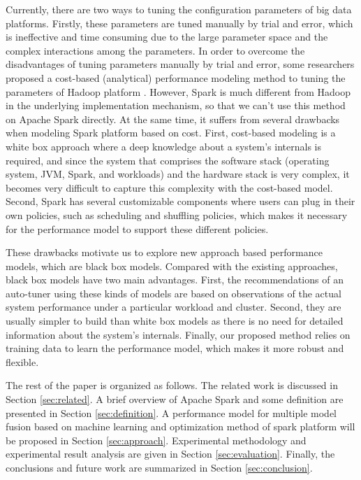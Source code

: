 \par Currently, there are two ways to tuning the configuration parameters of big data platforms. Firstly, these parameters are tuned manually by trial and error, which is ineffective and time consuming due to the large parameter space and the complex interactions among the parameters. In order to overcome the disadvantages of tuning parameters manually by trial and error, some researchers proposed a cost-based
(analytical) performance modeling method to tuning the parameters of Hadoop platform \cite{apachehadoop}. However, Spark is much different from Hadoop in the underlying implementation mechanism, so that we can’t use this method on Apache Spark directly. At the same time, it suffers from several drawbacks when modeling Spark platform based on cost. First, cost-based modeling is a white box approach where a deep knowledge
about a system’s internals is required, and since the system that comprises the software stack (operating system, JVM, Spark, and workloads) and the hardware stack is very complex, it becomes very difficult to capture this complexity with the cost-based model. Second, Spark has several customizable components where users can plug in their own policies, such as scheduling and shuffling policies, which makes it necessary for the performance model to support these different policies.

\par These drawbacks motivate us to explore new approach based performance models, which are black box models. Compared with the existing approaches, black box models have two main advantages. First, the recommendations of an auto-tuner using these kinds of models are based on observations of the actual system performance under a particular workload and cluster. Second, they are usually simpler to build than white box models as there is no need for detailed information about the system’s internals. Finally, our
proposed method relies on training data to learn the performance model, which makes it more robust and flexible.

\par The rest of the paper is organized as follows. The related work is discussed in Section \ref{sec:related}. A brief overview of Apache Spark and some definition are presented in Section \ref{sec:definition}. A performance model for multiple model fusion based on machine learning and optimization method of spark platform will be proposed in Section \ref{sec:approach}. Experimental methodology and experimental result analysis are given in Section \ref{sec:evaluation}. Finally, the conclusions and future work are summarized in Section \ref{sec:conclusion}. 
